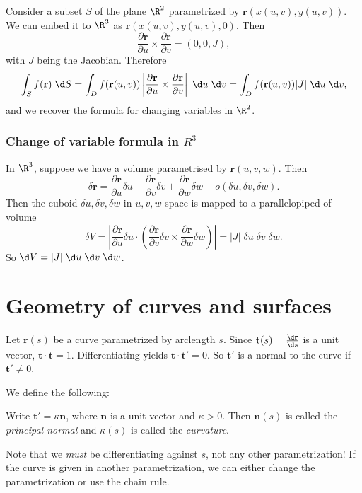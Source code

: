\documentclass[a4paper]{article}
\begin{document}
Consider a subset $S$ of the plane $\R^2$ parametrized by $\mathbf{r}(x(u, v), y(u, v))$. We can embed it to $\R^3$ as $\mathbf{r}(x(u, v), y(u, v), 0)$. Then
\[
  \frac{\partial \mathbf{r}}{\partial u}\times \frac{\partial\mathbf{r}}{\partial v} = (0, 0, J),
\]
with $J$ being the Jacobian.
Therefore
\[
  \int_S f(\mathbf{r})\;\d S = \int_D f(\mathbf{r}(u, v)) \left|\frac{\partial \mathbf{r}}{\partial u}\times \frac{\partial \mathbf{r}}{\partial v}\right| \;\d u\;\d v= \int_D f(\mathbf{r}(u, v))|J|\;\d u\;\d v,
\]
and we recover the formula for changing variables in $\R^2$.

\subsubsection*{Change of variable formula in \texorpdfstring{$R^3$}{R3}}
In $\R^3$, suppose we have a volume parametrised by $\mathbf{r}(u, v, w)$. Then
\[
  \delta \mathbf{r} = \frac{\partial \mathbf{r}}{\partial u}\delta u + \frac{\partial \mathbf{r}}{\partial v}\delta v + \frac{\partial \mathbf{r}}{\partial w}\delta w + o(\delta u, \delta v, \delta w).
\]
Then the cuboid $\delta u, \delta v, \delta w$ in $u, v, w$ space is mapped to a parallelopiped of volume
\[
  \delta V = \left|\frac{\partial \mathbf{r}}{\partial u}\delta u\cdot \left( \frac{\partial \mathbf{r}}{\partial v}\delta v \times \frac{\partial \mathbf{r}}{\partial w}\delta w\right)\right| = |J|\;\delta u\; \delta v\;\delta w.
\]
So $\d V = |J|\; \d u\; \d v\; \d w$.

\section{Geometry of curves and surfaces}
Let $\mathbf{r}(s)$ be a curve parametrized by arclength $s$. Since $\mathbf{t}(s) = \frac{\d \mathbf{r}}{\d s}$ is a unit vector, $\mathbf{t}\cdot \mathbf{t} = 1$. Differentiating yields $\mathbf{t}\cdot \mathbf{t}' = 0$. So $\mathbf{t}'$ is a normal to the curve if $\mathbf{t}' \not= 0$.

We define the following:
\begin{defi}
  Write $\mathbf{t}' = \kappa \mathbf{n}$, where $\mathbf{n}$ is a unit vector and $\kappa > 0$. Then $\mathbf{n}(s)$ is called the \emph{principal normal} and $\kappa(s)$ is called the \emph{curvature}.
\end{defi}
Note that we \emph{must} be differentiating against $s$, not any other parametrization! If the curve is given in another parametrization, we can either change the parametrization or use the chain rule.
\end{document}
